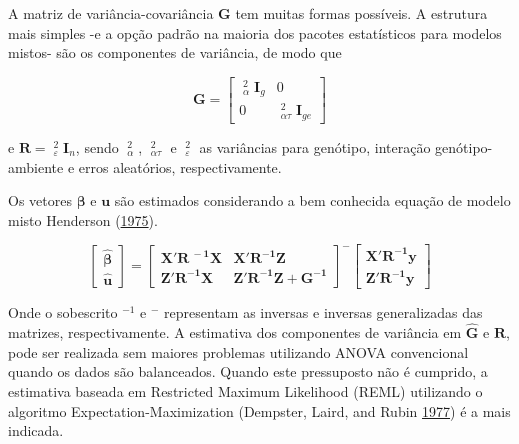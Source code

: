 \documentclass[
]{book}
\numberwithin{equation}{section}
\newcommand{\indt}[1]{\index{#1|ST}}
\begin{document}
A matriz de variância-covariância \textbf{G} tem muitas formas possíveis. A estrutura mais simples -e a opção padrão na maioria dos pacotes estatísticos para modelos mistos- são os componentes de variância, de modo que

\[
{\boldsymbol{G}} = \left[ {\begin{array}{*{20}{c}}{\mathop {\hat \sigma }\nolimits_\alpha ^2 {{\boldsymbol{I}}_g}}&0\\0&{\mathop {\hat \sigma }\nolimits_{\alpha \tau }^2 {{\boldsymbol{I}}_{ge}}}\end{array}} \right]
\]

e \({\boldsymbol{R}} = \mathop {\hat \sigma }\nolimits_\varepsilon ^2 {{\boldsymbol{I}}_n}\), sendo \(\mathop {\hat \sigma }\nolimits_\alpha ^2\), \(\mathop {\hat \sigma }\nolimits_{\alpha \tau }^2\) e \(\mathop {\hat \sigma }\nolimits_\varepsilon ^2\) as variâncias para genótipo, interação genótipo-ambiente e erros aleatórios, respectivamente.

Os vetores \({\boldsymbol{\beta }}\) e \(\boldsymbol{u}\) são estimados considerando a bem conhecida equação de modelo misto Henderson (\protect\hyperlink{ref-Henderson1975}{1975}).

\[ \label{ad}
\left[ {\begin{array}{*{20}{c}}{{\boldsymbol{\hat \beta }}}\\{{\boldsymbol{\hat u}}}\end{array}} \right]{\boldsymbol{ = }}{\left[ {\begin{array}{*{20}{c}}{{\boldsymbol{X'}}{{\boldsymbol{R}}^{\ - {\boldsymbol{1}}}}{\boldsymbol{X}}}&{{\boldsymbol{X'}}{{\boldsymbol{R}}^{ - {\boldsymbol{1}}}}{\boldsymbol{Z}}}\\{{\boldsymbol{Z'}}{{\boldsymbol{R}}^{ - {\boldsymbol{1}}}}{\boldsymbol{X}}}&{{\boldsymbol{Z'}}{{\boldsymbol{R}}^{ - {\boldsymbol{1}}}}{\boldsymbol{Z + }}{{\boldsymbol{G}}^{ - {\boldsymbol{1}}}}}\end{array}} \right]^ - }\left[ {\begin{array}{*{20}{c}}{{\boldsymbol{X'}}{{\boldsymbol{R}}^{ - {\boldsymbol{1}}}}{\boldsymbol{y}}}\\{{\boldsymbol{Z'}}{{\boldsymbol{R}}^{ - {\boldsymbol{1}}}}{\boldsymbol{y}}}\end{array}} \right]
\]

Onde o sobescrito \(^{-1}\) e \(^-\) representam as inversas e inversas generalizadas das matrizes, respectivamente. A estimativa dos componentes de variância em \({\boldsymbol{\hat G}}\) e \({\boldsymbol{\hat R}}\), pode ser realizada sem maiores problemas utilizando ANOVA \indt{ANOVA} convencional quando os dados são balanceados. Quando este pressuposto não é cumprido, a estimativa baseada em Restricted Maximum Likelihood (REML) \indt{REML} utilizando o algoritmo Expectation-Maximization (Dempster, Laird, and Rubin \protect\hyperlink{ref-Dempster1977}{1977}) é a mais indicada.
\end{document}
